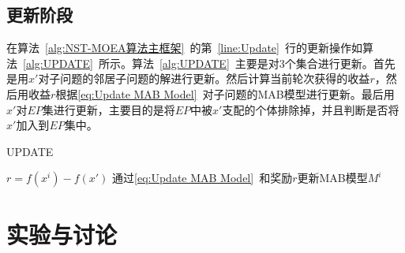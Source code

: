 \subsection{更新阶段}
\label{subsec:NST:算法设计:更新阶段}
在算法~\ref{alg:NST-MOEA算法主框架}~的第~\ref{line:Update}~行的更新操作如算法~\ref{alg:UPDATE}~所示。算法~\ref{alg:UPDATE}~主要是对3个集合进行更新。首先是用$x'$对子问题的邻居子问题的解进行更新。然后计算当前轮次获得的收益$r$，然后用收益$r$根据\autoref{eq:Update MAB Model}~对子问题的MAB模型进行更新。最后用$x'$对$EP$集进行更新，主要目的是将$EP$中被$x'$支配的个体排除掉，并且判断是否将$x'$加入到$EP$集中。
\par
\begin{algorithm}[!h]
    \caption{UPDATE}
    \label{alg:UPDATE}
    \BlankLine
    $r = f(x^i)-f(x')$ \;
    通过\autoref{eq:Update MAB Model}~和奖励$r$更新MAB模型$M^i$ \;
\end{algorithm}

\section{实验与讨论}
\label{sec:NST:实验与讨论}

